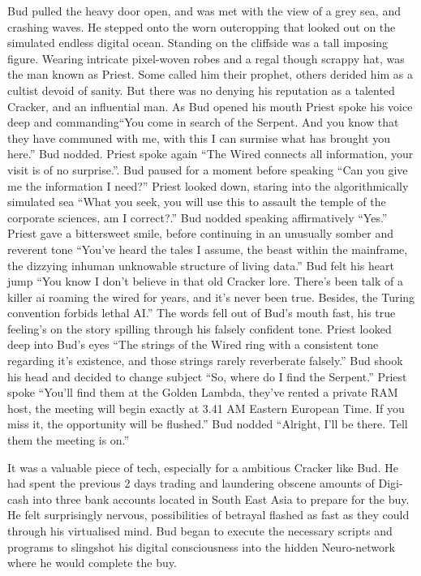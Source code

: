 \documentclass{book}
\begin{document}
Bud pulled the heavy door open, and was met with the view of a grey sea, and crashing waves. He stepped onto the worn outcropping that looked out on the simulated endless digital ocean. Standing on the cliffside was a tall imposing figure. Wearing intricate pixel-woven robes and a regal though scrappy hat, was the man known as Priest. Some called him their prophet, others derided him as a cultist devoid of sanity. But there was no denying his reputation as a talented Cracker, and an influential man. As Bud opened his mouth Priest spoke his voice deep and commanding``You come in search of the Serpent. And you know that they have communed with me, with this I can surmise what has brought you here.'' Bud nodded. Priest spoke again ``The Wired connects all information, your visit is of no surprise.''. Bud paused for a moment before speaking ``Can you give me the information I need?'' Priest looked down, staring into the algorithmically simulated sea ``What you seek, you will use this to assault the temple of the corporate sciences, am I correct?.'' Bud nodded speaking affirmatively ``Yes.'' Priest gave a bittersweet smile, before continuing in an unusually somber and reverent tone ``You've heard the tales I assume, the beast within the mainframe, the dizzying inhuman unknowable structure of living data.'' Bud felt his heart jump ``You know I don't believe in that old Cracker lore. There's been talk of a killer ai roaming the wired for years, and it's never been true. Besides, the Turing convention forbids lethal AI.'' The words fell out of Bud's mouth fast, his true feeling's on the story spilling through his falsely confident tone. Priest looked deep into Bud's eyes ``The strings of the Wired ring with a consistent tone regarding it's existence, and those strings rarely reverberate falsely.'' Bud shook his head and decided to change subject ``So, where do I find the Serpent.'' Priest spoke ``You'll find them at the Golden Lambda, they've rented a private RAM host, the meeting will begin exactly at 3.41 AM Eastern European Time. If you miss it, the opportunity will be flushed.'' Bud nodded ``Alright, I'll be there. Tell them the meeting is on.''

It was a valuable piece of tech, especially for a ambitious Cracker like Bud. He had spent the previous 2 days trading and laundering obscene amounts of Digi-cash into three bank accounts located in South East Asia to prepare for the buy. He felt surprisingly nervous, possibilities of betrayal flashed as fast as they could through his virtualised mind. Bud began to execute the necessary scripts and programs to slingshot his digital consciousness into the hidden Neuro-network where he would complete the buy.
\end{document}
